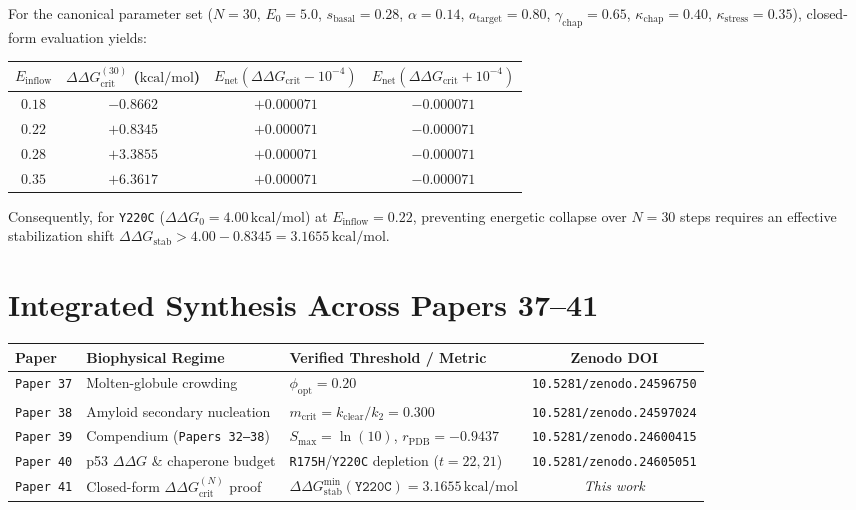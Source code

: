 \documentclass[11pt,a4paper]{article}
\begin{document}
For the canonical parameter set ($N=30$, $E_0=5.0$, $s_{\mathrm{basal}}=0.28$, $\alpha=0.14$, $a_{\mathrm{target}}=0.80$, $\gamma_{\mathrm{chap}}=0.65$, $\kappa_{\mathrm{chap}}=0.40$, $\kappa_{\mathrm{stress}}=0.35$), closed-form evaluation yields:
\begin{center}
\small
\begin{tabular}{cccc}
\toprule
$E_{\mathrm{inflow}}$ & $\Delta\Delta G_{\mathrm{crit}}^{(30)}$ ($\mathrm{kcal/mol}$) & $E_{\mathrm{net}}(\Delta\Delta G_{\mathrm{crit}} - 10^{-4})$ & $E_{\mathrm{net}}(\Delta\Delta G_{\mathrm{crit}} + 10^{-4})$ \\
\midrule
$0.18$ & $-0.8662$ & $+0.000071$ & $-0.000071$ \\
$0.22$ & $+0.8345$ & $+0.000071$ & $-0.000071$ \\
$0.28$ & $+3.3855$ & $+0.000071$ & $-0.000071$ \\
$0.35$ & $+6.3617$ & $+0.000071$ & $-0.000071$ \\
\bottomrule
\end{tabular}
\end{center}
Consequently, for \texttt{Y220C} ($\Delta\Delta G_0 = 4.00\,\mathrm{kcal/mol}$) at $E_{\mathrm{inflow}} = 0.22$, preventing energetic collapse over $N=30$ steps requires an effective stabilization shift $\Delta\Delta G_{\mathrm{stab}} > 4.00 - 0.8345 = 3.1655\,\mathrm{kcal/mol}$.

\section{Integrated Synthesis Across Papers 37--41}
\begin{center}
\small
\begin{tabular}{lllc}
\toprule
\textbf{Paper} & \textbf{Biophysical Regime} & \textbf{Verified Threshold / Metric} & \textbf{Zenodo DOI} \\
\midrule
\texttt{Paper 37} & Molten-globule crowding & $\phi_{\mathrm{opt}} = 0.20$ & \texttt{10.5281/zenodo.24596750} \\
\texttt{Paper 38} & Amyloid secondary nucleation & $m_{\mathrm{crit}} = k_{\mathrm{clear}}/k_2 = 0.300$ & \texttt{10.5281/zenodo.24597024} \\
\texttt{Paper 39} & Compendium (\texttt{Papers 32--38}) & $S_{\max} = \ln(10)$, $r_{\mathrm{PDB}} = -0.9437$ & \texttt{10.5281/zenodo.24600415} \\
\texttt{Paper 40} & p53 $\Delta\Delta G$ \& chaperone budget & \texttt{R175H}/\texttt{Y220C} depletion ($t=22, 21$) & \texttt{10.5281/zenodo.24605051} \\
\texttt{Paper 41} & Closed-form $\Delta\Delta G_{\mathrm{crit}}^{(N)}$ proof & $\Delta\Delta G_{\mathrm{stab}}^{\min}(\texttt{Y220C}) = 3.1655\,\mathrm{kcal/mol}$ & \emph{This work} \\
\bottomrule
\end{tabular}
\end{center}
\end{document}
